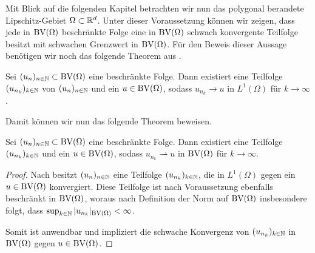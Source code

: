 Mit Blick auf die folgenden Kapitel betrachten wir nun
das polygonal berandete Lip\-schitz-Gebiet $\Omega\subset\mathbb{R}^d$. 
Unter dieser Voraussetzung können wir zeigen, dass jede in $\textup{BV}(\Omega)$
beschränkte Folge eine in $\textup{BV}(\Omega)$ schwach konvergente Teilfolge besitzt
mit schwachen Grenzwert in $\textup{BV}(\Omega)$. Für den Beweis dieser Aussage 
benötigen wir noch das folgende Theorem aus \cite[S. 176, Theorem 4]{EG92}.


\begin{theorem}
  \label{thm:l1ConvergentSubsequence}
  Sei $(u_n)_{n\in\mathbb{N}}\subset \textup{BV}(\Omega)$ eine beschränkte Folge. Dann 
  existiert eine Teilfolge $(u_{n_k})_{k\in\mathbb{N}}$ von
  $(u_n)_{n\in\mathbb{N}}$ und ein $u\in\textup{BV}(\Omega)$, sodass
  $u_{n_k}\to u$ in $L^1(\Omega)$ für $k\to \infty$.
\end{theorem}

Damit können wir nun das folgende Theorem beweisen.
\begin{theorem}
  \label{thm:compactness}
  Sei $(u_n)_{n\in\mathbb{N}}\subset \textup{BV}(\Omega)$ eine beschränkte Folge. Dann 
  existiert eine Teilfolge $(u_{n_k})_{k\in\mathbb{N}}$ und ein $u\in\textup{BV}(\Omega)$,
  sodass $u_{n_k}\rightharpoonup u$ in $\textup{BV}(\Omega)$ für $k\rightarrow\infty$.
\end{theorem}

\begin{proof}
  Nach  besitzt $(u_n)_{n\in\mathbb{N}}$ eine
  Teilfolge $(u_{n_k})_{k\in\mathbb{N}}$, die in $L^1(\Omega)$ gegen ein
  $u\in\textup{BV}(\Omega)$ konvergiert.
  Diese Teilfolge ist nach Voraussetzung ebenfalls beschränkt in 
  $\textup{BV}(\Omega)$, woraus nach Definition der Norm auf $\textup{BV}(\Omega)$ insbesondere
  folgt, dass
  $\sup_{k\in\mathbb{N}}|u_{n_k}|_{\textup{BV}(\Omega)}< \infty$. 
  
  Somit ist  anwendbar und impliziert die schwache Konvergenz von
  $(u_{n_k})_{k\in\mathbb{N}}$ in $\textup{BV}(\Omega)$ gegen $u\in\textup{BV}(\Omega)$.
\end{proof}
